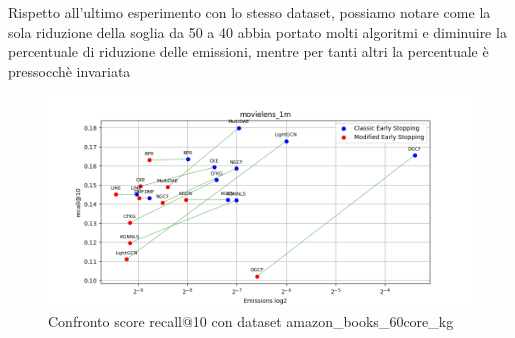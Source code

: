 \begin{table}[H]
    \centering
    \caption{Confronto delle emissioni}
\end{table}

\noindent Rispetto all'ultimo esperimento con lo stesso dataset, possiamo notare come la sola riduzione della soglia da 50 a 40 abbia portato molti algoritmi e diminuire la percentuale di riduzione delle emissioni, mentre per tanti altri la percentuale è pressocchè invariata

\begin{figure}[H]
    \centering
    \includegraphics[width=\linewidth, trim=0 0 0 0]{images/recall@10_movielens_1m_40_5_comparison.png}
    \caption{Confronto score recall@10 con dataset amazon\_books\_60core\_kg}
    
\end{figure}

